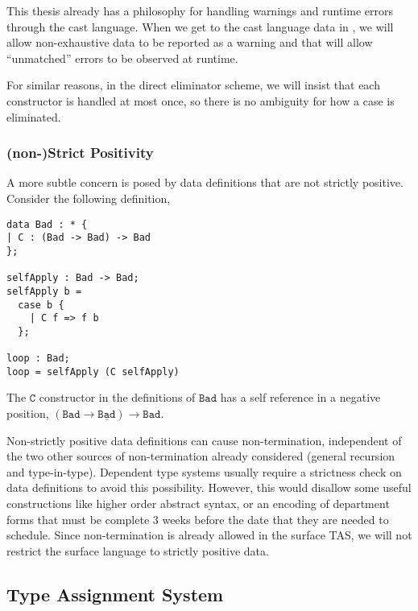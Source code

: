 
This thesis already has a philosophy for handling warnings and runtime errors through the cast language.
When we get to the cast language data in , we will allow non-exhaustive data to be reported as a warning and that will allow ``unmatched'' errors to be observed at runtime.

For similar reasons, in the direct eliminator scheme, we will insist that each constructor is handled at most once, so there is no ambiguity for how a case is eliminated.

\subsubsection{(non-)Strict Positivity}

A more subtle concern is posed by data definitions that are not strictly positive.
Consider the following definition, 

\begin{lstlisting}[basicstyle={\ttfamily\small}]
data Bad : * {
| C : (Bad -> Bad) -> Bad
};

selfApply : Bad -> Bad;
selfApply b =
  case b {
    | C f => f b
  };

loop : Bad;
loop = selfApply (C selfApply)
\end{lstlisting}

The $\mathtt{C}$ constructor in the definitions of $\mathtt{Bad}$ has a self reference in a negative position, $(\mathtt{Bad}\rightarrow\underline{\mathtt{Bad}})\rightarrow\mathtt{Bad}$. 

Non-strictly positive data definitions can cause non-termination, independent of the two other sources of non-termination already considered (general recursion and type-in-type).
Dependent type systems usually require a strictness check on data definitions to avoid this possibility.
However, this would disallow some useful constructions like higher order abstract syntax, or an encoding of department forms that must be complete 3 weeks before the date that they are needed to schedule.
Since non-termination is already allowed in the surface \ac{TAS}, we will not restrict the surface language to strictly positive data.



\subsection{Type Assignment System}

